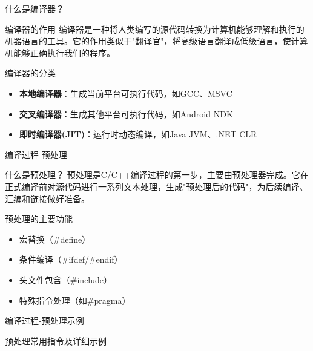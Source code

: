 \documentclass[UTF8,aspectratio=169]{beamer}
\begin{document}
\begin{frame}{什么是编译器？}
    \begin{ytublock}{编译器的作用}
        编译器是一种将人类编写的源代码转换为计算机能够理解和执行的机器语言的工具。它的作用类似于"翻译官"，将高级语言翻译成低级语言，使计算机能够正确执行我们的程序。
    \end{ytublock}

    \begin{ytublock}{编译器的分类}
        \begin{itemize}
            \item \textbf{本地编译器}：生成当前平台可执行代码，如GCC、MSVC
            \item \textbf{交叉编译器}：生成其他平台可执行代码，如Android NDK
            \item \textbf{即时编译器(JIT)}：运行时动态编译，如Java JVM、.NET CLR
        \end{itemize}
    \end{ytublock}
\end{frame}

\begin{frame}{编译过程-预处理}
    \begin{ytublock}{什么是预处理？}
        预处理是C/C++编译过程的第一步，主要由预处理器完成。它在正式编译前对源代码进行一系列文本处理，生成"预处理后的代码"，为后续编译、汇编和链接做好准备。
    \end{ytublock}
    \begin{ytublock}{预处理的主要功能}
        \begin{itemize}
            \item 宏替换（\#define）
            \item 条件编译（\#ifdef/\#endif）
            \item 头文件包含（\#include）
            \item 特殊指令处理（如\#pragma）
        \end{itemize}
    \end{ytublock}
\end{frame}

\begin{frame}{编译过程-预处理示例}
    \begin{ytublock}{预处理常用指令及详细示例}
        \inputminted{cpp}{code/preproc.cpp}
    \end{ytublock}
\end{frame}
\end{document}
